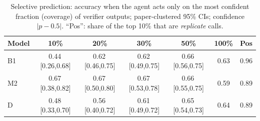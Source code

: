 \begin{table}[t]\centering\caption{Selective prediction: accuracy when the agent acts only on the most confident fraction (coverage) of verifier outputs; paper-clustered 95\% CIs; confidence $|p-0.5|$. ``Pos'': share of the top 10\% that are \emph{replicate} calls.}\label{tab:selective}
\scriptsize\setlength{\tabcolsep}{2.2pt}\begin{tabular}{@{}lcccccc@{}}\toprule
Model & 10\% & 20\% & 30\% & 50\% & 100\% & Pos \\\midrule
B1 & 0.44\,{\tiny[0.26,0.68]} & 0.62\,{\tiny[0.46,0.75]} & 0.62\,{\tiny[0.49,0.75]} & 0.66\,{\tiny[0.56,0.75]} & 0.63 & 0.96 \\
M2 & 0.67\,{\tiny[0.38,0.82]} & 0.67\,{\tiny[0.50,0.80]} & 0.67\,{\tiny[0.53,0.78]} & 0.66\,{\tiny[0.55,0.75]} & 0.59 & 0.89 \\
D & 0.48\,{\tiny[0.33,0.70]} & 0.56\,{\tiny[0.40,0.72]} & 0.61\,{\tiny[0.49,0.72]} & 0.65\,{\tiny[0.54,0.73]} & 0.64 & 0.89 \\
\bottomrule\end{tabular}\end{table}
